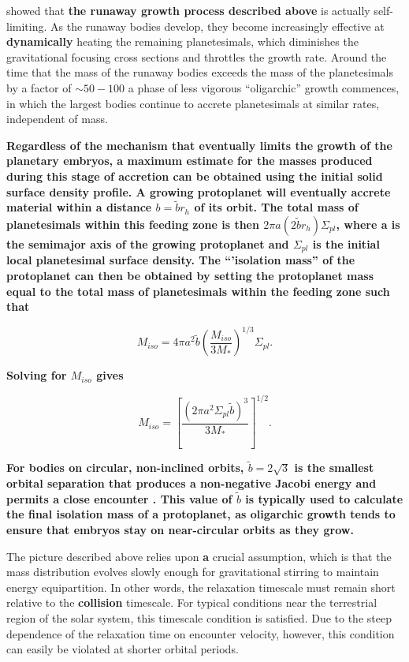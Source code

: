 \documentclass[twocolumn,linenumbers]{aastex63}
\begin{document}
\citet{kokubo98} showed that \textbf{the runaway growth process described above} is actually self-limiting. As the runaway
bodies develop, they become increasingly effective at \textbf{dynamically} heating the
remaining planetesimals, which diminishes the
gravitational focusing cross sections and throttles the growth rate. Around the time
that the mass of the runaway bodies exceeds the mass of the planetesimals
by a factor of $\sim 50-100$
\citep{ida93} a phase of less vigorous ``oligarchic'' 
growth commences, in which the largest bodies continue to 
accrete planetesimals at similar rates, independent of mass.

\textbf{Regardless of the mechanism that eventually limits the growth of the planetary embryos, a maximum estimate for the masses produced during this 
stage of accretion can be obtained using the initial solid surface density profile. A growing protoplanet will eventually accrete material within a distance
$b = \tilde{b} r_{h}$ of its orbit. The total mass of planetesimals within this feeding zone is then $2 \pi a \left(2 \tilde{b} r_{h} \right) \Sigma_{pl}$, where a is the semimajor axis of the growing protoplanet and $\Sigma_{pl}$ is the initial local planetesimal surface density. The ``'isolation mass'' of the protoplanet can then be obtained by setting the protoplanet mass equal to the total mass of planetesimals within the feeding zone such that}

\begin{equation}\label{eq:iso_mass1}
	M_{iso} = 4 \pi a^{2} \tilde{b} \left(\frac{M_{iso}}{3 M_{*}} \right)^{1/3} \Sigma_{pl}.
\end{equation}

\noindent \textbf{Solving for $M_{iso}$ gives}

\begin{equation}\label{eq:iso}
	M_{iso} = \left[ \frac{\left( 2 \pi a^2 \Sigma_{pl} \tilde{b} \right)^3}{3 M_{*}} \right]^{1/2}.
\end{equation}

\noindent \textbf{For bodies on circular, non-inclined orbits, $\tilde{b} = 2 \sqrt{3}$ is the smallest orbital separation that produces a non-negative
Jacobi energy and permits a close encounter \citep{naka88}. This value of $\tilde{b}$ is typically used to calculate the final isolation mass of a protoplanet, as oligarchic growth tends to ensure that embryos stay on near-circular orbits as they grow.}

The picture described above relies upon \textbf{a} crucial assumption, which
is that the mass distribution evolves slowly enough for gravitational stirring to maintain energy equipartition. In other words, the relaxation timescale must remain short relative to the \textbf{collision} timescale. For typical conditions near the terrestrial region of the solar system, this timescale condition is satisfied. Due to the steep dependence of the relaxation time on encounter velocity, however, this condition can easily be violated at shorter orbital periods.
\end{document}
